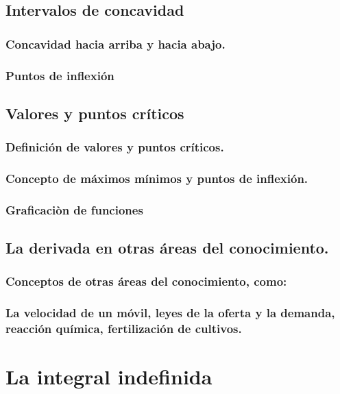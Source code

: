 \subsection{Intervalos de concavidad}
\subsubsection{Concavidad hacia arriba y hacia abajo.}
\subsubsection{Puntos de inflexión}

\subsection{Valores y puntos críticos}
\subsubsection{Definición de valores y puntos críticos.}
\subsubsection{Concepto de máximos mínimos y puntos de inflexión.}
\subsubsection{Graficaciòn de funciones}


\subsection{La derivada en otras áreas del conocimiento.}
\subsubsection{Conceptos de otras áreas del conocimiento, como:}
\subsubsection{La velocidad de un móvil, leyes de la oferta y la demanda, reacción química, fertilización de cultivos.}









\section{La integral indefinida} %
